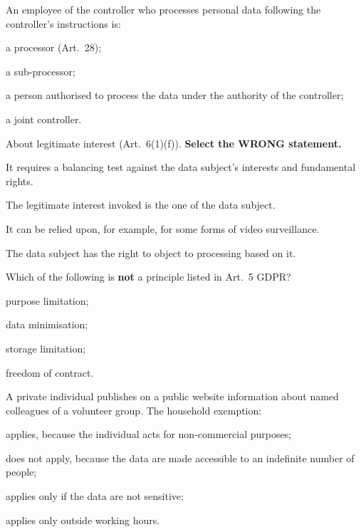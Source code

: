 \begin{domanda}\label{q:autorizzato}
An employee of the controller who processes personal data following the controller's instructions is:
\begin{opzioni}
  \item a processor (Art.~28);
  \item a sub-processor;
  \item a person authorised to process the data under the authority of the controller;
  \item a joint controller.
\end{opzioni}
\end{domanda}

\begin{domanda}\label{q:legittimo}
About legitimate interest (Art.~6(1)(f)). \textbf{Select the WRONG statement.}
\begin{opzioni}
  \item It requires a balancing test against the data subject's interests and fundamental rights.
  \item The legitimate interest invoked is the one of the data subject.
  \item It can be relied upon, for example, for some forms of video surveillance.
  \item The data subject has the right to object to processing based on it.
\end{opzioni}
\end{domanda}

\begin{domanda}\label{q:principi}
Which of the following is \textbf{not} a principle listed in Art.~5 GDPR?
\begin{opzioni}
  \item purpose limitation;
  \item data minimisation;
  \item storage limitation;
  \item freedom of contract.
\end{opzioni}
\end{domanda}

\begin{domanda}\label{q:domestica}
A private individual publishes on a public website information about named colleagues of a
volunteer group. The household exemption:
\begin{opzioni}
  \item applies, because the individual acts for non-commercial purposes;
  \item does not apply, because the data are made accessible to an indefinite number of people;
  \item applies only if the data are not sensitive;
  \item applies only outside working hours.
\end{opzioni}
\end{domanda}

